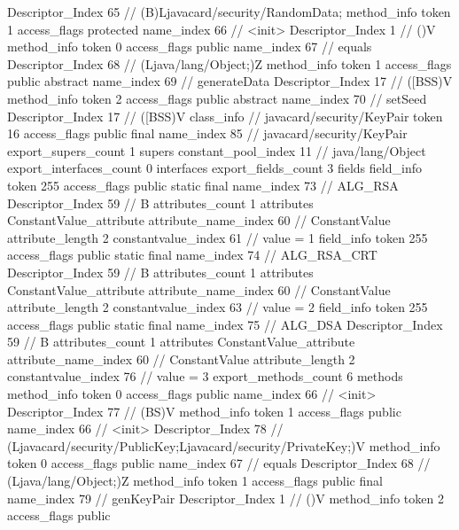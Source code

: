 {{{{{					Descriptor_Index	65		// (B)Ljavacard/security/RandomData;
				}
				method_info {
					token	1
					access_flags	protected
					name_index	66		// <init>
					Descriptor_Index	1		// ()V
				}
				method_info {
					token	0
					access_flags	public
					name_index	67		// equals
					Descriptor_Index	68		// (Ljava/lang/Object;)Z
				}
				method_info {
					token	1
					access_flags	public abstract
					name_index	69		// generateData
					Descriptor_Index	17		// ([BSS)V
				}
				method_info {
					token	2
					access_flags	public abstract
					name_index	70		// setSeed
					Descriptor_Index	17		// ([BSS)V
				}
			}
		}
		class_info {		// javacard/security/KeyPair
			token	16
			access_flags	public final
			name_index	85		// javacard/security/KeyPair
			export_supers_count	1
			supers {
				constant_pool_index	11		// java/lang/Object
			}
			export_interfaces_count	0
			interfaces {
			}
			export_fields_count	3
			fields {
			field_info {
				token	255
				access_flags	public static final
				name_index	73		// ALG_RSA
				Descriptor_Index	59		// B
				attributes_count	1
				attributes {
				ConstantValue_attribute {
					attribute_name_index	60		// ConstantValue
					attribute_length	2
					constantvalue_index	61		// value = 1
				}
				}
			}
			field_info {
				token	255
				access_flags	public static final
				name_index	74		// ALG_RSA_CRT
				Descriptor_Index	59		// B
				attributes_count	1
				attributes {
				ConstantValue_attribute {
					attribute_name_index	60		// ConstantValue
					attribute_length	2
					constantvalue_index	63		// value = 2
				}
				}
			}
			field_info {
				token	255
				access_flags	public static final
				name_index	75		// ALG_DSA
				Descriptor_Index	59		// B
				attributes_count	1
				attributes {
				ConstantValue_attribute {
					attribute_name_index	60		// ConstantValue
					attribute_length	2
					constantvalue_index	76		// value = 3
				}
				}
			}
			}
			export_methods_count	6
			methods {
				method_info {
					token	0
					access_flags	public
					name_index	66		// <init>
					Descriptor_Index	77		// (BS)V
				}
				method_info {
					token	1
					access_flags	public
					name_index	66		// <init>
					Descriptor_Index	78		// (Ljavacard/security/PublicKey;Ljavacard/security/PrivateKey;)V
				}
				method_info {
					token	0
					access_flags	public
					name_index	67		// equals
					Descriptor_Index	68		// (Ljava/lang/Object;)Z
				}
				method_info {
					token	1
					access_flags	public final
					name_index	79		// genKeyPair
					Descriptor_Index	1		// ()V
				}
				method_info {
					token	2
					access_flags	public
}}}}}
